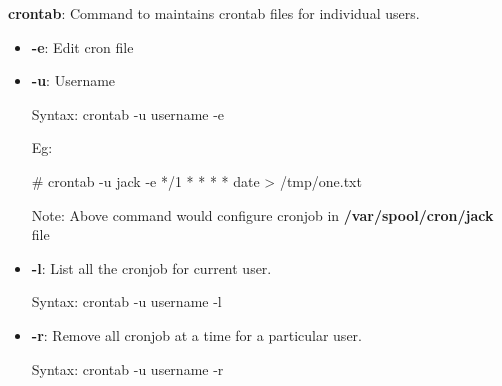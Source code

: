 \setlength{\columnsep}{3pt}
\begin{flushleft}
	\textbf{crontab}: Command to maintains crontab files for individual users.
	\begin{itemize}
		\item \textbf{-e}: Edit cron file
		\item \textbf{-u}:  Username
		\bigskip
		\begin{tcolorbox}[breakable,notitle,boxrule=-0pt,colback=pink,colframe=pink]
			\color{black}
			\font=9pt
			Syntax: crontab -u username -e
			\font=4pt
		\end{tcolorbox}
		Eg:
		\begin{tcolorbox}[breakable,notitle,boxrule=-0pt,colback=black,colframe=black]
			\color{green}
			\font=9pt
			\# crontab -u jack -e
			\newline
			*/1 	* 	*	*	*   date > /tmp/one.txt
			\font=4pt
		\end{tcolorbox}
		\bigskip
		\begin{tcolorbox}[breakable,notitle,boxrule=1pt,colback=yellow,colframe=yellow]
		\color{black}
			Note: Above command would configure cronjob in \textbf{/var/spool/cron/jack} file
		\end{tcolorbox}
		
		\bigskip
		
		\item \textbf{-l}: List all the cronjob for current user.
		\bigskip
		\begin{tcolorbox}[breakable,notitle,boxrule=-0pt,colback=pink,colframe=pink]
			\color{black}
			\font=9pt
			Syntax: crontab -u username -l
			\font=4pt
		\end{tcolorbox}
		
		
		\bigskip
		
		\item \textbf{-r}: Remove all cronjob at a time for a particular user.
		\bigskip
		\begin{tcolorbox}[breakable,notitle,boxrule=-0pt,colback=pink,colframe=pink]
			\color{black}
			\font=9pt
			Syntax: crontab -u username -r	
			\font=4pt
		\end{tcolorbox}
		
	\end{itemize}


\end{flushleft}
\newpage


